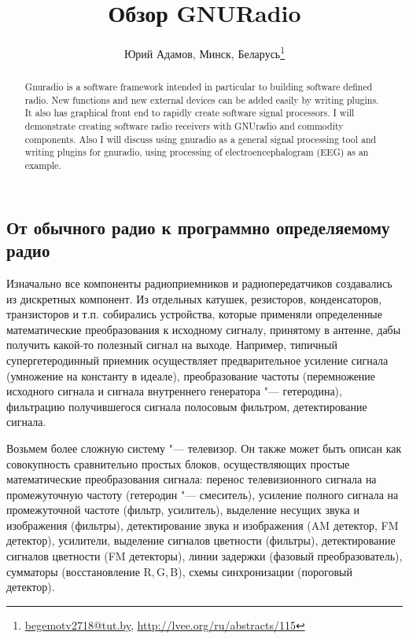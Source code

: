 \documentclass[10pt, a5paper]{article}
\begin{document}
\title{Обзор GNURadio}
\author{Юрий Адамов, Минск, Беларусь\footnote{\url{begemotv2718@tut.by}, \url{http://lvee.org/ru/abstracts/115}}}
\maketitle
\begin{abstract}
Gnuradio is a software framework intended in particular to building software defined radio. New functions and new external devices can be added easily by writing plugins. It also has graphical front end to rapidly create software signal processors.
I will demonstrate creating software radio receivers with GNUradio and commodity components.
Also I will discuss using gnuradio as a general signal processing tool and writing plugins for gnuradio, using processing of electroencephalogram (EEG) as an example.
\end{abstract}
\subsection*{От обычного радио к программно определяемому радио}

Изначально все компоненты радиоприемников и радиопередатчиков создавались из дискретных компонент. Из отдельных катушек, резисторов,  конденсаторов, транзисторов и т.п. собирались устройства, которые применяли определенные математические преобразования к исходному сигналу, принятому в антенне, дабы получить какой-то полезный сигнал на выходе. Например, типичный супергетеродинный приемник осуществляет предварительное усиление сигнала (умножение на константу в идеале), преобразование частоты (перемножение исходного сигнала и сигнала внутреннего генератора "--- гетеродина), фильтрацию получившегося сигнала полосовым фильтром, детектирование сигнала.

Возьмем более сложную систему "--- телевизор. Он также может быть описан как совокупность сравнительно простых блоков, осуществляющих простые математические преобразования сигнала: перенос телевизионного сигнала на промежуточную частоту (гетеродин "--- смеситель), усиление полного сигнала на промежуточной частоте (фильтр, усилитель), выделение несущих звука и изображения (фильтры), детектирование звука и изображения (AM детектор, FM детектор), усилители, выделение сигналов цветности (фильтры), детектирование сигналов цветности (FM детекторы), линии задержки (фазовый преобразователь), сумматоры (восстановление R,\,G,\,B), схемы синхронизации (пороговый детектор).
\end{document}
